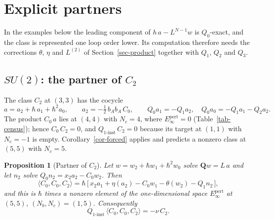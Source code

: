 \documentclass[11pt]{article}
\numberwithin{equation}{section}
\numberwithin{figure}{section}
\numberwithin{table}{section}
\newtheorem{proposition}[theorem]{Proposition}
\theoremstyle{definition}
\newcommand{\Qp}{\mathbf Q}
\newcommand{\Qi}{Q_{1\text{-}\mathrm{inst}}}
\newcommand{\Ep}{E_\infty^{\mathrm{pert}}}
\begin{document}
\section{Explicit partners}\label{sec-partners}

In the examples below the leading component of $h\,a-L^{N-1}w$ is $Q_0$-exact, and the class is represented one loop order lower. Its computation therefore needs the corrections $\theta$, $\eta$ and $L^{(2)}$ of Section~\ref{sec-product} together with $Q_1$, $Q_2$ and $Q_3$.

\subsection{$SU(2)$: the partner of $C_2$}\label{sec-C2}

The class $C_2$ at $(3,3)$ has the cocycle
\begin{equation}\label{eq-C2}
a=a_2+\hbar\,a_1+\hbar^2a_0,\qquad a_2=-\tfrac12\,b_Ab_A\,C_0,\qquad Q_0a_1=-Q_1a_2,\quad Q_0a_0=-Q_1a_1-Q_2a_2 .
\end{equation}
The product $C_0\,a$ lies at $(4,4)$ with $N_c=4$, where $\Ep=0$ (Table~\ref{tab-census}); hence $C_0\,C_2=0$, and $\Qi\,C_2=0$ because its target at $(1,1)$ with $N_c=-1$ is empty. Corollary~\ref{cor-forced} applies and predicts a nonzero class at $(5,5)$ with $N_c=5$.

\begin{proposition}[Partner of $C_2$]\label{prop-C2}
Let $w=w_2+\hbar w_1+\hbar^2w_0$ solve $\Qp w=L\,a$ and let $n_2$ solve $Q_0n_2=x_2a_2-C_0w_2$. Then
\begin{equation}\label{eq-m1}
\langle C_0,C_0,C_2\rangle=\hbar\,\big[\,x_2a_1+\eta(a_2)-C_0w_1-\theta(w_2)-Q_1n_2\,\big],
\end{equation}
and this is $\hbar$ times a nonzero element of the one-dimensional space $\Ep$ at $(5,5)$, $(N_b,N_c)=(1,5)$. Consequently
\begin{equation}\label{eq-C2-lift}
\Qi\,\langle C_0,C_0,C_2\rangle=-\nu\,C_2 .
\end{equation}
\end{proposition}
\end{document}
